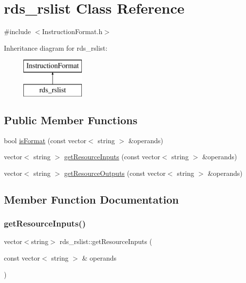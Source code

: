 \hypertarget{classrds__rslist}{}\section{rds\+\_\+rslist Class Reference}
\label{classrds__rslist}


{\ttfamily \#include $<$Instruction\+Format.\+h$>$}

Inheritance diagram for rds\+\_\+rslist\+:\begin{figure}[H]
\begin{center}
\leavevmode
\includegraphics[height=2.000000cm]{classrds__rslist}
\end{center}
\end{figure}
\subsection*{Public Member Functions}
\begin{DoxyCompactItemize}
\item 
bool \hyperlink{classrds__rslist_a3b1c315345a6e795534f04788f810f31}{is\+Format} (const vector$<$ string $>$ \&operands)
\item 
vector$<$ string $>$ \hyperlink{classrds__rslist_a8b7009023b3cfecdd39dc36118c33069}{get\+Resource\+Inputs} (const vector$<$ string $>$ \&operands)
\item 
vector$<$ string $>$ \hyperlink{classrds__rslist_a495f7309e2936109a910d06d9d19f9f5}{get\+Resource\+Outputs} (const vector$<$ string $>$ \&operands)
\end{DoxyCompactItemize}


\subsection{Member Function Documentation}
\mbox{\label{classrds__rslist_a8b7009023b3cfecdd39dc36118c33069}} 
\subsubsection{\texorpdfstring{get\+Resource\+Inputs()}{getResourceInputs()}}
{\footnotesize\ttfamily vector$<$string$>$ rds\+\_\+rslist\+::get\+Resource\+Inputs (\begin{DoxyParamCaption}\item[{const vector$<$ string $>$ \&}]{operands }\end{DoxyParamCaption})\hspace{0.3cm}{\ttfamily [virtual]}}

